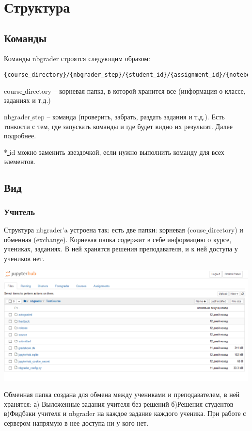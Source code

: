 \documentclass[a4paper,12pt]{article}
\begin{document}
\section{Структура}
\subsection{Команды}

Команды nbgrader строятся следующим образом:
\begin{verbatim}
{course_directory}/{nbgrader_step}/{student_id}/{assignment_id}/{notebook_id}.ipynb
\end{verbatim}
course\underline{ }directory -- корневая папка, в которой хранится все (информация о классе, заданиях и т.д.)

nbgrader\underline{ }step -- команда (проверить, забрать, раздать задания и т.д.). Есть тонкости с тем, где запускать команды и где будет видно их результат. Далее подробнее.

*\underline{ }id можно заменить звездочкой, если нужно выполнить команду для всех элементов.
\subsection{Вид}
\subsubsection{Учитель}
Структура nbgrader'a устроена так: есть две папки: корневая (couse\underline{ }directory) и обменная (exchange). Корневая папка содержит в себе информацию о курсе, учениках, заданиях. В ней хранятся решения преподавателя, и к ней доступа у учеников нет.

\includegraphics[width=\textwidth]{grader_root_directory}

Обменная папка создана для обмена между учениками и преподавателем, в ней хранятся: а) Выложенные задания учителя без решений б)Решения студентов в)Фидбэки учителя и nbgrader на каждое задание каждого ученика. При работе с сервером напрямую в нее доступа ни у кого нет.
\end{document}
